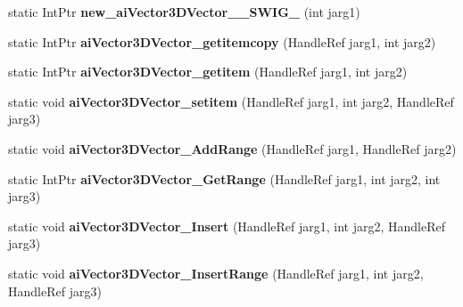 \begin{DoxyCompactItemize}
\item 
\hypertarget{class_assimp_p_i_n_v_o_k_e_a7a510ffe0e2dc85601f6aca134cd8132}{static Int\+Ptr {\bfseries new\+\_\+ai\+Vector3\+D\+Vector\+\_\+\+\_\+\+S\+W\+I\+G\+\_} (int jarg1)}\label{class_assimp_p_i_n_v_o_k_e_a7a510ffe0e2dc85601f6aca134cd8132}

\item 
\hypertarget{class_assimp_p_i_n_v_o_k_e_a77786d079f2db884edf4c6c9db8b96a8}{static Int\+Ptr {\bfseries ai\+Vector3\+D\+Vector\+\_\+getitemcopy} (Handle\+Ref jarg1, int jarg2)}\label{class_assimp_p_i_n_v_o_k_e_a77786d079f2db884edf4c6c9db8b96a8}

\item 
\hypertarget{class_assimp_p_i_n_v_o_k_e_a19d0e29c5577d3efddafec68ca51637f}{static Int\+Ptr {\bfseries ai\+Vector3\+D\+Vector\+\_\+getitem} (Handle\+Ref jarg1, int jarg2)}\label{class_assimp_p_i_n_v_o_k_e_a19d0e29c5577d3efddafec68ca51637f}

\item 
\hypertarget{class_assimp_p_i_n_v_o_k_e_a9c1c2dcff91d11f82e91c464d8dcc668}{static void {\bfseries ai\+Vector3\+D\+Vector\+\_\+setitem} (Handle\+Ref jarg1, int jarg2, Handle\+Ref jarg3)}\label{class_assimp_p_i_n_v_o_k_e_a9c1c2dcff91d11f82e91c464d8dcc668}

\item 
\hypertarget{class_assimp_p_i_n_v_o_k_e_af46832d8ded2536b1ee7ec7b2b4402e3}{static void {\bfseries ai\+Vector3\+D\+Vector\+\_\+\+Add\+Range} (Handle\+Ref jarg1, Handle\+Ref jarg2)}\label{class_assimp_p_i_n_v_o_k_e_af46832d8ded2536b1ee7ec7b2b4402e3}

\item 
\hypertarget{class_assimp_p_i_n_v_o_k_e_a8fc66012fa1fc9806f0a3ac754f196b2}{static Int\+Ptr {\bfseries ai\+Vector3\+D\+Vector\+\_\+\+Get\+Range} (Handle\+Ref jarg1, int jarg2, int jarg3)}\label{class_assimp_p_i_n_v_o_k_e_a8fc66012fa1fc9806f0a3ac754f196b2}

\item 
\hypertarget{class_assimp_p_i_n_v_o_k_e_a8311791a55bd5faaefaa103eb75e44d2}{static void {\bfseries ai\+Vector3\+D\+Vector\+\_\+\+Insert} (Handle\+Ref jarg1, int jarg2, Handle\+Ref jarg3)}\label{class_assimp_p_i_n_v_o_k_e_a8311791a55bd5faaefaa103eb75e44d2}

\item 
\hypertarget{class_assimp_p_i_n_v_o_k_e_a9c10595664e19e7656eb2537c6daab18}{static void {\bfseries ai\+Vector3\+D\+Vector\+\_\+\+Insert\+Range} (Handle\+Ref jarg1, int jarg2, Handle\+Ref jarg3)}\label{class_assimp_p_i_n_v_o_k_e_a9c10595664e19e7656eb2537c6daab18}


\end{DoxyCompactItemize}
